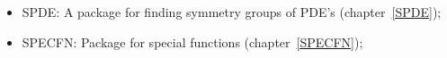 \begin{itemize}
\item
{SPDE: A package for finding symmetry groups of {PDE}'s}
(chapter~\ref{SPDE}); 

\item
{SPECFN: Package for special functions} (chapter~\ref{SPECFN});


\end{itemize}

